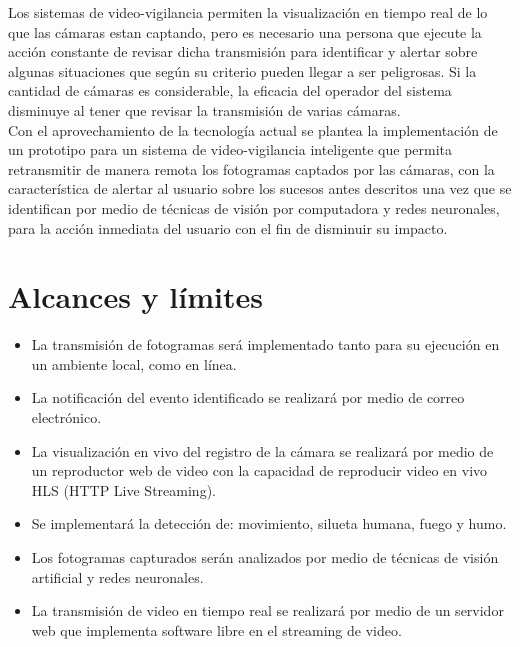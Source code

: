 Los sistemas de video-vigilancia permiten la visualización en tiempo real de lo que las cámaras estan captando, pero es necesario una persona que ejecute la acción constante de revisar dicha transmisión para identificar y alertar sobre algunas situaciones que según su criterio pueden llegar a ser peligrosas. Si la cantidad de cámaras es considerable, la eficacia del operador del sistema disminuye al tener que revisar la transmisión de varias cámaras.\\

Con el aprovechamiento de la tecnología actual se plantea la implementación de un prototipo para un sistema de video-vigilancia inteligente que permita retransmitir de manera remota los fotogramas captados por las cámaras, con la característica de alertar al usuario sobre los sucesos antes descritos una vez que se identifican por medio de técnicas de visión por computadora y redes neuronales, para la acción inmediata del usuario con el fin de disminuir su impacto.\\

\section{Alcances y límites}
\begin{itemize}
    \item La transmisión de fotogramas será implementado tanto para su ejecución en un ambiente local, como en línea.
    \item La notificación del evento identificado se realizará por medio de correo electrónico.
    \item La visualización en vivo del registro de la cámara se realizará por medio de un reproductor web de video con la capacidad de reproducir video en vivo HLS (HTTP Live Streaming).
    \item Se implementará la detección de: movimiento, silueta humana, fuego y humo.
    \item Los fotogramas capturados serán analizados por medio de técnicas de visión artificial y redes neuronales.
    \item La transmisión de video en tiempo real se realizará por medio de un servidor web que implementa software libre en el streaming de video.
\end{itemize}